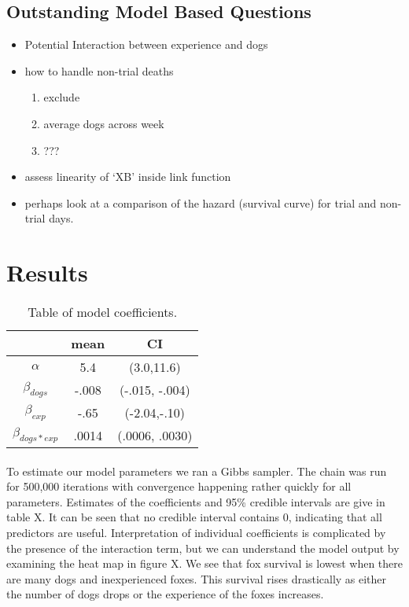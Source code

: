 \documentclass[aoas,preprint]{imsart}
\numberwithin{equation}{section}
\theoremstyle{plain}
\begin{document}
  
  \subsection{Outstanding Model Based Questions}
  \begin{itemize}
  \item Potential Interaction between experience and dogs
  \item how to handle non-trial deaths
  \begin{enumerate}
  \item exclude
  \item average dogs across week
  \item ???
  \end{enumerate}
  \item assess linearity of `XB' inside link function
  \item perhaps look at a comparison of the hazard (survival curve) for trial and non-trial days.
  \end{itemize}
  
\section{Results}




\begin{table}[h]
	\begin{center}
		\begin{tabular}{|c|c|c|}
			\hline
			& mean & CI \\
			\hline
			$\alpha$ & 5.4 & (3.0,11.6) \\
			$\beta_{dogs}$ & -.008 & (-.015, -.004) \\
			$\beta_{exp}$ & -.65 & (-2.04,-.10) \\
			$\beta_{dogs*exp}$ & .0014 & (.0006, .0030)\\
			\hline
		\end{tabular}
	\end{center}
	\caption{Table of model coefficients.}
\end{table}

\paragraph{}To estimate our model parameters we ran a Gibbs sampler. The chain was run for 500,000 iterations with convergence happening rather quickly for all parameters. Estimates of the coefficients and 95\% credible intervals are give in table X. It can be seen that no credible interval contains 0, indicating that all predictors are useful. Interpretation of individual coefficients is complicated by the presence of the interaction term, but we can understand the model output by examining the heat map in figure X. We see that fox survival is lowest when there are many dogs and inexperienced foxes. This survival rises drastically as either the number of dogs drops or the experience of the foxes increases.
\end{document}
